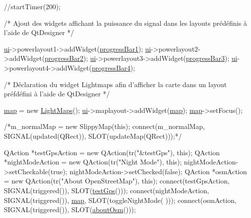 \begin{DoxyCode}
    \textcolor{comment}{//startTimer(200);}

    \textcolor{comment}{/* Ajout des widgets affichant la puissance du signal dans les layouts
       prédéfinis à l'aide de QtDesigner */}

    \hyperlink{classMainWindow_a35466a70ed47252a0191168126a352a5}{ui}->powerlayout1->addWidget(\hyperlink{classMainWindow_a50d8f5aa716821eca4ad0a3bfb0cf2ec}{progressBar1});
    \hyperlink{classMainWindow_a35466a70ed47252a0191168126a352a5}{ui}->powerlayout2->addWidget(\hyperlink{classMainWindow_a0594f2275ce1af436549e95cf62cfe7d}{progressBar2});
    \hyperlink{classMainWindow_a35466a70ed47252a0191168126a352a5}{ui}->powerlayout3->addWidget(\hyperlink{classMainWindow_a4afea90f9ba8cd1d26fa3b552639a012}{progressBar3});
    \hyperlink{classMainWindow_a35466a70ed47252a0191168126a352a5}{ui}->powerlayout4->addWidget(\hyperlink{classMainWindow_a8672c729ad5494d2890676bf07518ea2}{progressBar4});



    \textcolor{comment}{/* Déclaration du widget Lightmaps afin d'afficher la carte dans un layout
       préfdéfini à l'aide de QtDesigner */}

    \hyperlink{classMainWindow_a2f9e7ca90c2813bd1969055871782cfb}{map} = \textcolor{keyword}{new} \hyperlink{classLightMaps}{LightMaps}();
    \hyperlink{classMainWindow_a35466a70ed47252a0191168126a352a5}{ui}->maplayout->addWidget(\hyperlink{classMainWindow_a2f9e7ca90c2813bd1969055871782cfb}{map});
    \hyperlink{classMainWindow_a2f9e7ca90c2813bd1969055871782cfb}{map}->setFocus();

    \textcolor{comment}{/*m\_normalMap = new SlippyMap(this);}
\textcolor{comment}{    connect(m\_normalMap, SIGNAL(updated(QRect)), SLOT(updateMap(QRect)));*/}

    QAction *testGpsAction = \textcolor{keyword}{new} QAction(tr(\textcolor{stringliteral}{"&testGps"}), \textcolor{keyword}{this});
    QAction *nightModeAction = \textcolor{keyword}{new} QAction(tr(\textcolor{stringliteral}{"Night Mode"}), \textcolor{keyword}{this});
    nightModeAction->setCheckable(\textcolor{keyword}{true});
    nightModeAction->setChecked(\textcolor{keyword}{false});
    QAction *osmAction = \textcolor{keyword}{new} QAction(tr(\textcolor{stringliteral}{"About OpenStreetMap"}), \textcolor{keyword}{this});
    connect(testGpsAction, SIGNAL(triggered()), SLOT(\hyperlink{classMainWindow_a99e264f214b0841cb0f990ae7b103289}{testGps}()));
    connect(nightModeAction, SIGNAL(triggered()), \hyperlink{classMainWindow_a2f9e7ca90c2813bd1969055871782cfb}{map}, SLOT(toggleNightMode(
      )));
    connect(osmAction, SIGNAL(triggered()), SLOT(\hyperlink{classMainWindow_af8ce1443f9a63d9edb6207f6361c0b9c}{aboutOsm}()));


\end{DoxyCode}
